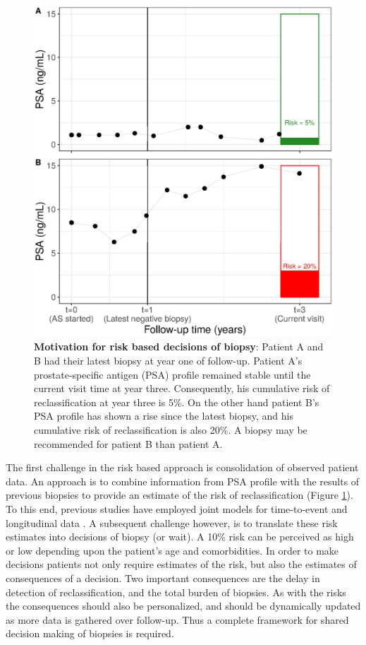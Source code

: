 \begin{figure}[!htb]
\centerline{\includegraphics[width=\columnwidth]{images/riskBasedExample.eps}}
\caption{\textbf{Motivation for risk based decisions of biopsy}: Patient A and B had their latest biopsy at year one of follow-up. Patient A's prostate-specific antigen (PSA) profile remained stable until the current visit time at year three. Consequently, his cumulative risk of reclassification at year three is 5\%. On the other hand patient B's PSA profile has shown a rise since the latest biopsy, and his cumulative risk of reclassification is also 20\%. A biopsy may be recommended for patient B than patient A.}
\label{fig:riskBasedExample}
\end{figure}

The first challenge in the risk based approach is consolidation of observed patient data. An approach is to combine information from PSA profile with the results of previous biopsies to provide an estimate of the risk of reclassification (Figure \ref{fig:riskBasedExample}). To this end, previous studies have employed joint models for time-to-event and longitudinal data \citep{rizopoulos2012joint,tomer2019,coley2017prediction}. A subsequent challenge however, is to translate these risk estimates into decisions of biopsy (or wait). A 10\% risk can be perceived as high or low depending upon the patient's age and comorbidities. In order to make decisions patients not only require estimates of the risk, but also the estimates of consequences of a decision. Two important consequences are the delay in detection of reclassification, and the total burden of biopsies. As with the risks the consequences should also be personalized, and should be dynamically updated as more data is gathered over follow-up. Thus a complete framework for shared decision making of biopsies is required.

